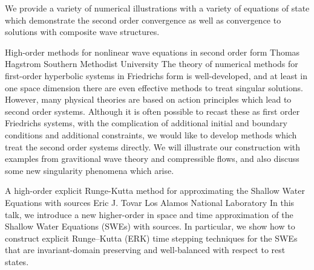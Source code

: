 \begin{addmargin}[2em]{0em}
{We provide a variety of numerical illustrations with a variety of equations of state which demonstrate the second order convergence as well as convergence to solutions with composite wave structures.}


\vspace{1.5ex}
\abs
{High-order methods for nonlinear wave equations in second order form}
{Thomas Hagstrom}
{Southern Methodist University}
{The theory of numerical methods for first-order hyperbolic systems in Friedrichs form is well-developed, and at least in one space dimension there are even effective methods to treat singular solutions. However, many physical theories are based on action principles which lead to second order systems. Although it is often possible to recast these as first order Friedrichs systems, with the complication of additional initial and boundary conditions and additional constraints, we would like to develop methods which treat the second order systems directly. We will illustrate our construction with examples from gravitional wave theory and compressible flows, and also discuss some new singularity phenomena which arise.}


\vspace{1.5ex}
\abs
{A high-order explicit Runge-Kutta method for approximating the Shallow Water Equations with sources}
{Eric J. Tovar}
{Los Alamos National Laboratory}
{In this talk, we introduce a new higher-order in space and time approximation of the Shallow Water Equations (SWEs) with sources. In particular, we show how to construct explicit Runge–Kutta (ERK) time stepping techniques for the SWEs that are invariant-domain preserving and well-balanced with respect to rest states.}



\end{addmargin}
